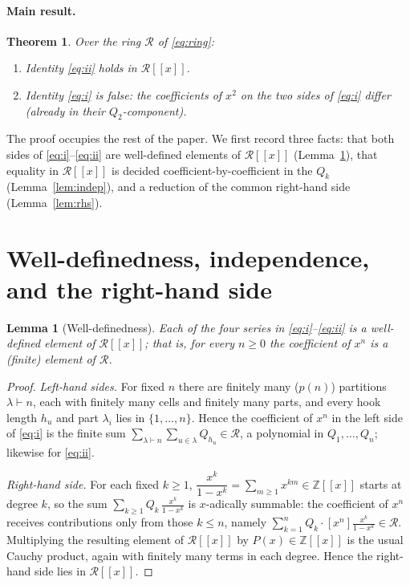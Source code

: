 \documentclass[12pt]{article}
\newtheorem{theorem}{Theorem}
\newtheorem{lemma}{Lemma}
\theoremstyle{definition}
\begin{document}
\paragraph{Main result.}
\begin{theorem}\label{thm:main}
Over the ring $\mathcal R$ of \eqref{eq:ring}:
\begin{enumerate}
\item[(ii)] Identity \eqref{eq:ii} holds in $\mathcal R[[x]]$.
\item[(i)] Identity \eqref{eq:i} is false: the coefficients of $x^2$ on the two
sides of \eqref{eq:i} differ (already in their $Q_2$-component).
\end{enumerate}
\end{theorem}

The proof occupies the rest of the paper. We first record three facts: that both
sides of \eqref{eq:i}--\eqref{eq:ii} are well-defined elements of $\mathcal R[[x]]$
(Lemma~\ref{lem:welldef}), that equality in $\mathcal R[[x]]$ is decided
coefficient-by-coefficient in the $Q_k$ (Lemma~\ref{lem:indep}), and a reduction of
the common right-hand side (Lemma~\ref{lem:rhs}).

\section{Well-definedness, independence, and the right-hand side}

\begin{lemma}[Well-definedness]\label{lem:welldef}
Each of the four series in \eqref{eq:i}--\eqref{eq:ii} is a well-defined element of
$\mathcal R[[x]]$; that is, for every $n\ge0$ the coefficient of $x^n$ is a (finite)
element of $\mathcal R$.
\end{lemma}

\begin{proof}
\emph{Left-hand sides.} For fixed $n$ there are finitely many ($p(n)$) partitions
$\lambda\vdash n$, each with finitely many cells and finitely many parts, and every
hook length $h_u$ and part $\lambda_i$ lies in $\{1,\dots,n\}$. Hence the coefficient
of $x^n$ in the left side of \eqref{eq:i} is the finite sum
$\sum_{\lambda\vdash n}\sum_{u\in\lambda}Q_{h_u}\in\mathcal R$, a polynomial in
$Q_1,\dots,Q_n$; likewise for \eqref{eq:ii}.

\emph{Right-hand side.} For each fixed $k\ge1$,
$\dfrac{x^k}{1-x^k}=\sum_{m\ge1}x^{km}\in\mathbb Z[[x]]$ starts at degree $k$, so the
sum $\sum_{k\ge1}Q_k\,\frac{x^k}{1-x^k}$ is $x$-adically summable: the coefficient of
$x^n$ receives contributions only from those $k\le n$, namely
$\sum_{k=1}^{n}Q_k\cdot[x^n]\frac{x^k}{1-x^k}\in\mathcal R$. Multiplying the
resulting element of $\mathcal R[[x]]$ by $P(x)\in\mathbb Z[[x]]$ is the usual Cauchy
product, again with finitely many terms in each degree. Hence the right-hand side
lies in $\mathcal R[[x]]$.
\end{proof}
\end{document}
